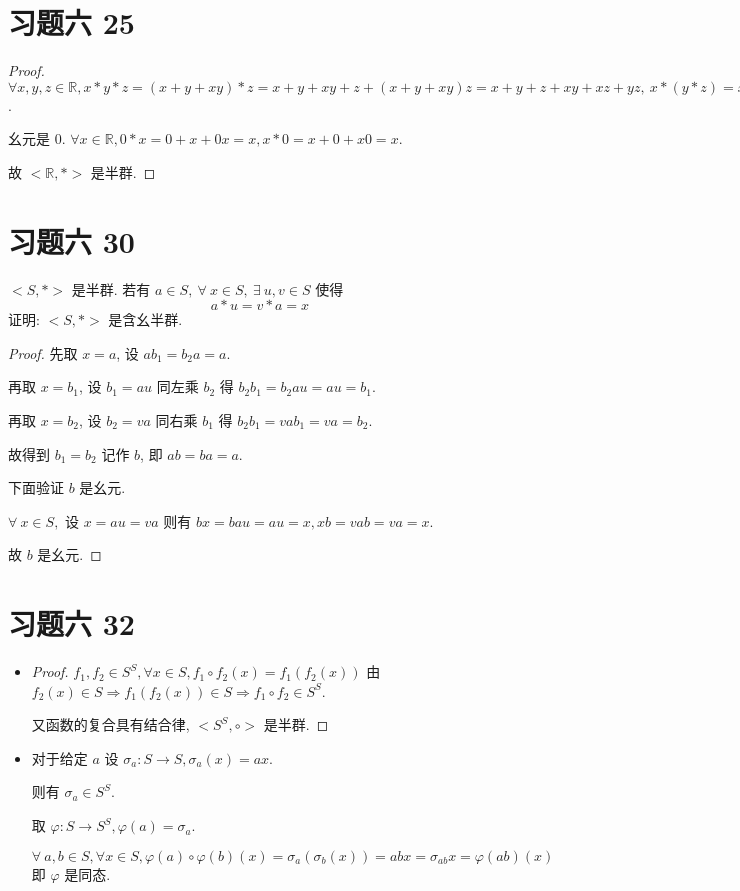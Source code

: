 \section{习题六 25}

\begin{proof}
	$\forall x,y,z\in \mathbb R,x*y*z=(x+y+xy)*z=x+y+xy+z+(x+y+xy)z=x+y+z+xy+xz+yz,\ x*(y*z)=x*(y+z+yz)=x+y+z+xy+xz+yz$.
	
	幺元是 $0$. $\forall x\in \mathbb R,0*x=0+x+0x=x,x*0=x+0+x0=x$.
	
	故 $<\mathbb R,*>$ 是半群.
\end{proof}

\section{习题六 30}
$<S,*>$ 是半群. 若有 $a\in S,\ \forall\ x\in S,\ \exists\ u,v\in S$ 使得 $$a*u=v*a=x$$ 证明: $<S,*>$ 是含幺半群.

\begin{proof}
先取 $x=a$, 设 $ab_1=b_2a=a$.

再取 $x=b_1$, 设 $b_1=au$ 同左乘 $b_2$ 得
$b_2b_1=b_2au=au=b_1$.

再取 $x=b_2$, 设 $b_2=va$ 同右乘 $b_1$ 得
$b_2b_1=vab_1=va=b_2$.

故得到 $b_1=b_2$ 记作 $b$, 即 $ab=ba=a$.

下面验证 $b$ 是幺元.

$\forall\ x\in S,$ 设 $x=au=va$ 则有 $bx=bau=au=x,xb=vab=va=x$.

故 $b$ 是幺元.
\end{proof}

\section{习题六 32}

\begin{itemize}
	\item[(1)]
	\begin{proof}
		$f_1,f_2\in S^S, \forall x\in S,f_1\circ f_2 (x)=f_1(f_2(x))$ 由 $f_2(x)\in S\Rightarrow f_1(f_2(x))\in S\Rightarrow f_1\circ f_2\in S^S$.
		
		又函数的复合具有结合律, $<S^S,\circ>$ 是半群. 
	\end{proof}
	\item[(2)]
	\begin{solution}
		对于给定 $a$ 设 $\sigma_a: S\to S,\sigma_a(x)=ax$.
		
		则有 $\sigma_a\in S^S$.
		
		取 $\varphi:S\to S^S,\varphi(a)=\sigma_a$.
		
		$\forall\ a,b\in S,\forall x\in S,\varphi(a)\circ\varphi(b)(x)=\sigma_a(\sigma_b(x))=abx=\sigma_{ab}x=\varphi(ab)(x)$ 即 $\varphi$ 是同态.
	\end{solution}
\end{itemize}

